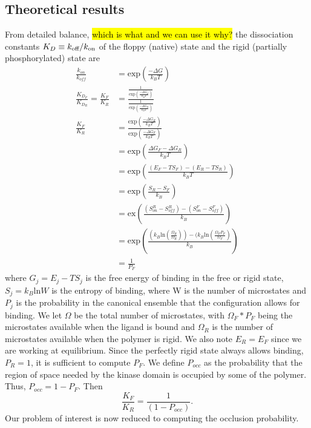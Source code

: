 \documentclass[../AdvancementSummary.tex]{subfiles}
\begin{document}
\subsection{Theoretical results}


From detailed balance, \hl{which is what and we can use it why?} the dissociation constants $K_D \equiv k_{\mbox{\scriptsize off}}/k_{\mbox{\scriptsize on}}$ of the floppy (native) state and the rigid (partially phosphorylated) state are
\begin{align} 
\frac{k_{on}}{k_{off}} &= \mbox{exp} \left( \frac{-\Delta G}{k_B T}\right) \\
\frac{K_{D_F}}{K_{D_R}} = \frac{K_F}{K_R} &= \frac{\frac{1}{\mbox{exp} \left( \frac{-\Delta G_F}{k_B T}\right) }}{\frac{1}{\mbox{exp} \left( \frac{-\Delta G_R}{k_B T}\right)}} \\ 
\frac{K_F}{K_R} &= \frac{\mbox{exp} \left( \frac{-\Delta G_R}{k_B T} \right)}{\mbox{exp} \left( \frac{-\Delta G_F}{k_B T} \right)} \\
&= \mbox{exp} \left(\frac{\Delta G_F-\Delta G_R}{k_B T}\right) \\
&= \mbox{exp} \left( \frac{(E_F-T S_F)-(E_R-T S_R)}{k_B T} \right) \\
&= \mbox{exp} \left(\frac{S_R-S_F}{k_B}\right) \\
&=\mbox{ex}\left(\frac{(S^R_{on}-S^R_{off}) - (S^F_{on}-S^F_{off})}{k_B} \right) \\
&= \mbox{exp} \left( \frac{(k_B \mbox{ln} (\frac{\Omega_R}{\Omega_R}))-(k_B \mbox{ln}(\frac{\Omega_F P_F}{\Omega_F})}{k_B} \right) \\
&= \frac{1}{P_F}
\end{align}  
where $G_j=E_j-TS_j$ is the free energy of binding in the free or rigid state, $S_j = k_B \mbox{ln} W$ is the entropy of binding, where W is the number of microstates and $P_j$ is the probability in the canonical ensemble that the configuration allows for binding. We let $\Omega$ be the total number of microstates, with $\Omega_F * P_F$ being the microstates available when the ligand is bound and $\Omega_R$ is the number of microstates available when the polymer is rigid.  We also note $E_R = E_F$ since we are working at equilibrium. Since the perfectly rigid state always allows binding, $P_R=1$, it is sufficient to compute $P_F$. We define $P_{occ}$ as the probability that the region of space needed by the kinase domain is occupied by some of the polymer. Thus, $P_{occ}=1-P_F$. Then
\begin{equation}
\frac{K_F}{K_R} = \frac{1}{(1-P_{occ})}.
\end{equation}
Our problem of interest is now reduced to computing the occlusion probability. 
\end{document}
